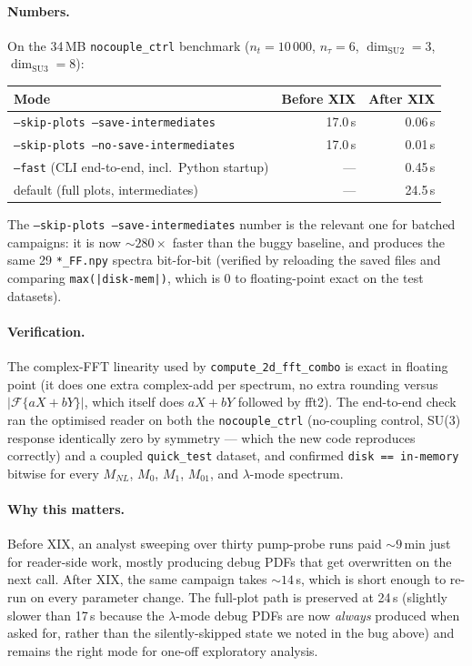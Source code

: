 \documentclass[11pt,letterpaper]{article}
\begin{document}
\paragraph{Numbers.}
On the 34\,MB \texttt{nocouple\_ctrl} benchmark
($n_t=10\,000$, $n_\tau=6$, $\dim_{\mathrm{SU2}}=3$,
$\dim_{\mathrm{SU3}}=8$):
\begin{center}
\begin{tabular}{lrr}
\hline
\textbf{Mode} & \textbf{Before XIX} & \textbf{After XIX}\\
\hline
\texttt{--skip-plots --save-intermediates}    & 17.0\,s & 0.06\,s \\
\texttt{--skip-plots --no-save-intermediates} & 17.0\,s & 0.01\,s \\
\texttt{--fast} (CLI end-to-end, incl.\ Python startup) & --- & 0.45\,s \\
default (full plots, intermediates)           & ---     & 24.5\,s \\
\hline
\end{tabular}
\end{center}
The \texttt{--skip-plots --save-intermediates} number is the
relevant one for batched campaigns: it is now $\sim 280\times$
faster than the buggy baseline, and produces the same 29
\texttt{*\_FF.npy} spectra bit-for-bit (verified by reloading the
saved files and comparing
\texttt{max(|disk-mem|)}, which is $0$ to floating-point exact
on the test datasets).

\paragraph{Verification.}
The complex-FFT linearity used by \texttt{compute\_2d\_fft\_combo}
is exact in floating point (it does one extra complex-add per
spectrum, no extra rounding versus
$\lvert\mathcal F\{aX+bY\}\rvert$, which itself does $aX+bY$
followed by fft2).  The end-to-end check ran the optimised reader
on both the \texttt{nocouple\_ctrl} (no-coupling control,
SU(3) response identically zero by symmetry --- which the new
code reproduces correctly) and a coupled \texttt{quick\_test}
dataset, and confirmed
\texttt{disk == in-memory} bitwise for every $M_{NL}$,
$M_0$, $M_1$, $M_{01}$, and $\lambda$-mode spectrum.

\paragraph{Why this matters.}
Before XIX, an analyst sweeping over thirty pump-probe runs paid
$\sim 9\,$min just for reader-side work, mostly producing
debug PDFs that get overwritten on the next call.  After XIX,
the same campaign takes $\sim 14\,$s, which is short enough to
re-run on every parameter change.  The full-plot path is
preserved at 24\,s (slightly slower than 17\,s because the
$\lambda$-mode debug PDFs are now \emph{always} produced when
asked for, rather than the silently-skipped state we noted in
the bug above) and remains the right mode for one-off
exploratory analysis.
\end{document}
